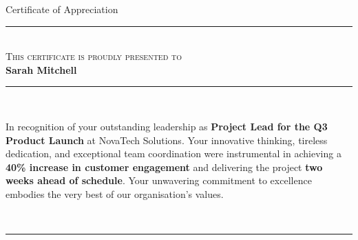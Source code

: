 \documentclass[11pt,a4paper,landscape]{article}
\begin{document}
\begin{center}
  \vspace*{6mm}

  {\fontsize{46}{54}\calligra\color{accent}Certificate of Appreciation}\\[3mm]

  {\color{accentlight}\rule{100mm}{0.3pt}}\\[10mm]

  {\color{dark}\fontsize{14}{20}\selectfont\scshape This certificate is proudly presented to}\\[9mm]

  {\color{accent}\fontsize{38}{46}\selectfont\bfseries Sarah Mitchell}\\[11mm]

  {\color{accentlight}\rule{70mm}{0.3pt}}\\[12mm]

  \begin{minipage}{0.72\textwidth}
    \centering
    {\color{dark}\fontsize{11.5}{19}\selectfont
    In recognition of your outstanding leadership as
    \textbf{Project Lead for the Q3 Product Launch}
    at NovaTech Solutions. Your innovative thinking, tireless dedication,
    and exceptional team coordination were instrumental in achieving a
    \textbf{40\% increase in customer engagement} and delivering the
    project \textbf{two weeks ahead of schedule}. Your unwavering
    commitment to excellence embodies the very best of our
    organisation's values.}
  \end{minipage}\\[14mm]

  {\color{accentlight}\rule{70mm}{0.3pt}}\\[14mm]

  \begin{minipage}{\textwidth}
    \centering
{}
  \end{minipage}


\end{center}
\end{document}
